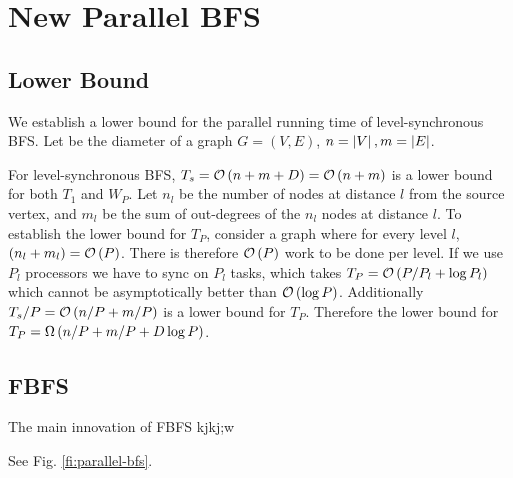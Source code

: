 \section{New Parallel BFS}

\subsection{Lower Bound}
We establish a lower bound for the parallel running time of level-synchronous BFS.
Let  be the diameter of a graph $G=(V,E)$, $n=\left|V\right|, m=\left|E\right|$.

For level-synchronous BFS, $T_s={\mathcal O}\left({n+m+D}\right)={\mathcal O}\left({n+m}\right)$ is a lower bound for both $T_1$ and $W_P$. 
Let $n_l$ be the number of nodes at distance $l$ from the source vertex, and $m_l$ be the sum of out-degrees
of the $n_l$ nodes at distance $l$.
To establish the lower bound for $T_P$, consider a graph where for every level $l$, $(n_l+m_l) = {\mathcal O}\left({P}\right)$.
There is therefore ${\mathcal O}\left({P}\right)$ work to be done per level.  If we use $P_l$ processors we have to sync on $P_l$ tasks, which takes $T_P={\mathcal O}\left({P/P_l + \log P_l}\right)$ which cannot be asymptotically better than ${\mathcal O}\left({\log P}\right)$.
Additionally $T_s/P={\mathcal O}\left({n/P+m/P}\right)$ is a lower bound for $T_P$.
Therefore the lower bound for $T_P={\Omega}\left({n/P+m/P+D\log P}\right)$.

\subsection{FBFS}
The main innovation of FBFS kjkj;w

See Fig. \ref{fi:parallel-bfs}.

